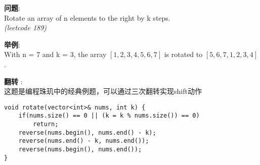     
\begin{description}
    \item{\textbf{问题}}:\\
Rotate an array of n elements to the right by k steps.\\
\textit{(leetcode 189)}
    \item{\textbf{举例}}:\\
With n = 7 and k = 3, the array $[1,2,3,4,5,6,7]$ is rotated to $[5,6,7,1,2,3,4]$.
    \item{\textbf{翻转}} : 
    \\这题是编程珠玑中的经典例题，可以通过三次翻转实现shift动作
    \begin{lstlisting}
void rotate(vector<int>& nums, int k) {
	if(nums.size() == 0 || (k = k % nums.size()) == 0)	
		return;
	reverse(nums.begin(), nums.end() - k);
	reverse(nums.end() - k, nums.end());
	reverse(nums.begin(), nums.end());
}
    \end{lstlisting}
\end{description}
